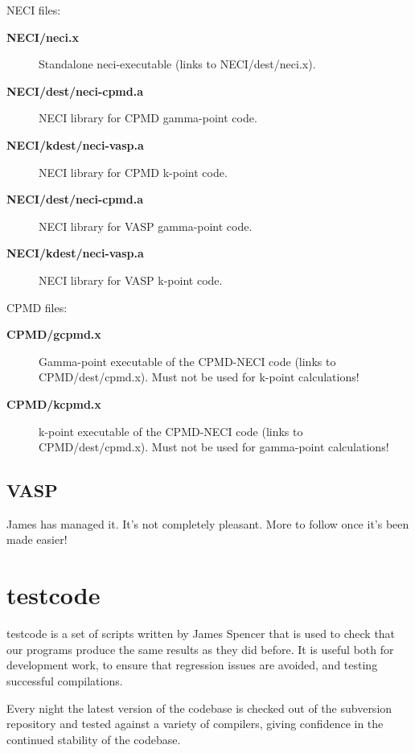 \documentclass[openany,a4paper,10pt,english]{manual}
\begin{document}
NECI files:
\begin{description}
\item[\textbf{NECI/neci.x}] \leavevmode
Standalone neci-executable (links to NECI/dest/neci.x).

\item[\textbf{NECI/dest/neci-cpmd.a}] \leavevmode
NECI library for CPMD gamma-point code.

\item[\textbf{NECI/kdest/neci-vasp.a}] \leavevmode
NECI library for CPMD k-point code.

\item[\textbf{NECI/dest/neci-cpmd.a}] \leavevmode
NECI library for VASP gamma-point code.

\item[\textbf{NECI/kdest/neci-vasp.a}] \leavevmode
NECI library for VASP k-point code.

\end{description}

CPMD files:
\begin{description}
\item[\textbf{CPMD/gcpmd.x}] \leavevmode
Gamma-point executable of the CPMD-NECI code (links to CPMD/dest/cpmd.x).
Must not be used for k-point calculations!

\item[\textbf{CPMD/kcpmd.x}] \leavevmode
k-point executable of the CPMD-NECI code (links to CPMD/dest/cpmd.x).
Must not be used for gamma-point calculations!

\end{description}


\subsection{VASP}

James has managed it.  It's not completely pleasant.  More to follow
once it's been made easier!


\section{testcode}

testcode is a set of scripts written by James Spencer that is used to
check that our programs produce the same results as they did before.
It is useful both for development work, to ensure that regression issues
are avoided, and testing successful compilations.

Every night the latest version of the codebase is checked out of the
subversion repository and tested against a variety of compilers, giving
confidence in the continued stability of the codebase.
\end{document}

